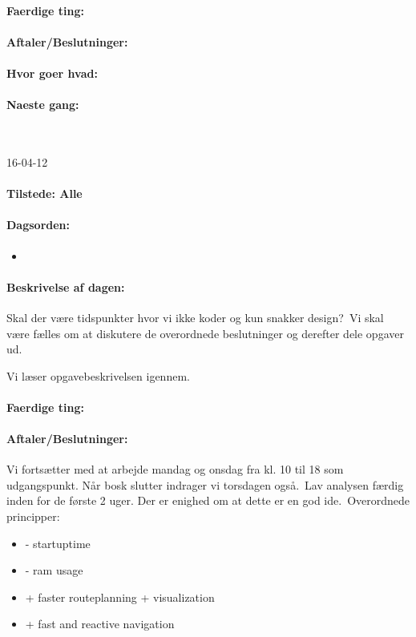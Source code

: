 \documentclass[a4paper,10pt,titlepage]{article}
\begin{document}
		\paragraph{Faerdige ting:}
		
		\paragraph{Aftaler/Beslutninger:}
		
		\paragraph{Hvor goer hvad:}
		
		\paragraph{Naeste gang:}\mbox{}\\
		
		\begin{center}
		16-04-12
		\end{center}
		
		\paragraph{Tilstede: Alle}
		\paragraph{Dagsorden:}
		\begin{itemize}
					\item 
					
		\end{itemize}
		
		\paragraph{Beskrivelse af dagen:}
		Skal der være tidspunkter hvor vi ikke koder og kun snakker design?\
Vi skal være fælles om at diskutere de overordnede beslutninger og derefter dele opgaver ud.\

Vi læser opgavebeskrivelsen igennem.

		\paragraph{Faerdige ting:}
		
		\paragraph{Aftaler/Beslutninger:}
		Vi fortsætter med at arbejde mandag og onsdag fra kl. 10 til 18 som udgangspunkt. Når bosk slutter indrager vi torsdagen også.\
		Lav analysen færdig inden for de første 2 uger. Der er enighed om at dette er en god ide.\
		Overordnede principper:
		\begin{itemize}
		\item - startuptime
		\item - ram usage
		\item + faster routeplanning + visualization
		\item + fast and reactive navigation
		\end{itemize}
			
\end{document}
